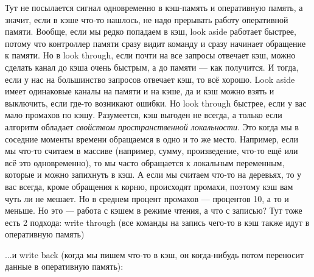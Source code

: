 \documentclass{article}
\begin{document}
    Тут не посылается сигнал одновременно в кэш-память и оперативную память, а значит, если в кэше что-то нашлось, не надо прерывать работу оперативной памяти. Вообще, если мы редко попадаем в кэш, look aside работает быстрее, потому что контроллер памяти сразу видит команду и сразу начинает обращение к памяти. Но в look through, если почти на все запросы отвечает кэш, можно сделать канал до кэша очень быстрым, а до памяти --- как получится. И тогда, если у нас на большинство запросов отвечает кэш, то всё хорошо. Look aside имеет одинаковые каналы на памяти и на кэше, да и кэш можно взять и выключить, если где-то возникают ошибки. Но look through быстрее, если у вас мало промахов по кэшу. Разумеется, кэш выгоден не всегда, а только если алгоритм обладает \textit{свойством пространственной локальности}. Это когда мы в соседние моменты времени обращаемся в одно и то же место. Например, если мы что-то считаем в массиве (например, сумму, произведение, что-то ещё или всё это одновременно), то мы часто обращается к локальным переменным, которые и можно запихнуть в кэш. А если мы считаем что-то на деревьях, то у вас всегда, кроме обращения к корню, происходят промахи, поэтому кэш вам чуть ли не мешает. Но в среднем процент промахов --- процентов 10, а то и меньше. Но это --- работа с кэшем в режиме чтения, а что с записью? Тут тоже есть 2 подхода: write through (все команды на запись чего-то в кэш также идут в оперативную память)
    \begin{center}
    \end{center}
    ...и write back (когда мы пишем что-то в кэш, он когда-нибудь потом переносит данные в оперативную память):
    \begin{center}
    \end{center}
\end{document}

